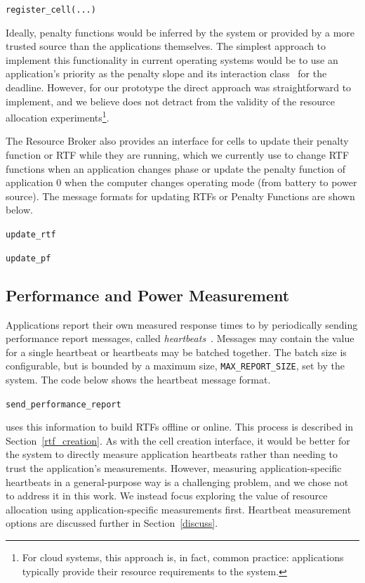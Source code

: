 \texttt{register\_cell(...)}


Ideally, penalty functions would be inferred by the system or provided by a
more trusted source than the applications themselves.  The simplest approach to implement this functionality in current operating systems would be to use an application's priority as the penalty slope and its interaction class~\cite{} for the deadline. However, for our prototype the direct approach was straightforward to implement, and we believe does not detract from the validity of the resource allocation experiments\footnote{For cloud systems, this approach is, in fact, common practice: applications typically provide their resource requirements to the system.}.  


The Resource Broker also provides an interface for cells to update their penalty function or RTF while they are running, which we currently use to change RTF functions when an application changes phase or update the penalty function of application 0 when the computer changes operating mode (\ie from battery to power source).  The message formats for updating RTFs or Penalty Functions are shown below.

\texttt{update\_rtf}

\texttt{update\_pf}

\subsection{Performance and Power Measurement}
Applications report their own measured response times to \pacora by periodically sending performance report messages, called \emph{heartbeats}~\cite{hoffmann2011}.  Messages may contain the value for a single heartbeat or heartbeats may be batched together.  The batch size is configurable, but is bounded by a maximum size, \texttt{MAX\_REPORT\_SIZE}, set by the system.   The code below shows the heartbeat message format.

\texttt{send\_performance\_report}

\pacora uses this information to build RTFs offline or online.  This process is described in Section~\ref{rtf_creation}.  As with the cell creation interface, it would be better for the system to directly measure application heartbeats rather than needing to trust the application's measurements.  However, measuring application-specific heartbeats in a general-purpose way is a challenging problem, and we chose not to address it in this work.  We instead focus exploring the value of resource allocation using application-specific measurements first.  Heartbeat measurement options are discussed further in Section~\ref{discuss}.

